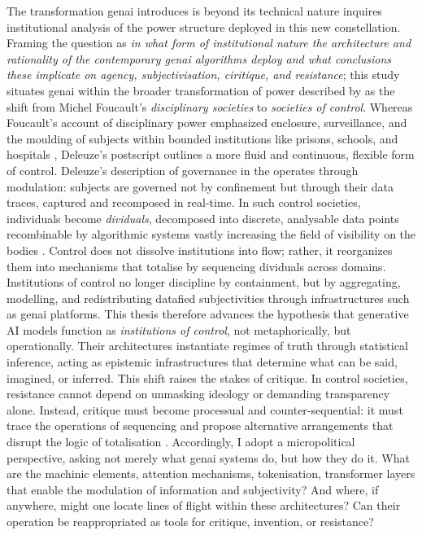 The transformation \gls{genai} introduces is beyond its technical nature inquires institutional analysis \parencite{mackenzie2021} of the power structure deployed in this new constellation. Framing the question as \emph{in what form of institutional nature the architecture and rationality of the contemporary \gls{genai} algorithms deploy and what conclusions these implicate on agency, subjectivisation, ciritique, and resistance}; this study situates \gls{genai} within the broader transformation of power described by \textcite{deleuze1992a} as the shift from Michel Foucault's \emph{disciplinary societies} \cite{Foucault1977} to \emph{societies of control}. Whereas Foucault’s account of disciplinary power emphasized enclosure, surveillance, and the moulding of subjects within bounded institutions like prisons, schools, and hospitals \parencite{foucault2008}, Deleuze's postscript outlines a more fluid and continuous, flexible form of control. Deleuze's description of governance in the  operates through modulation: subjects are governed not by confinement but through their data traces, captured and recomposed in real-time. In such control societies, individuals become \emph{dividuals}, decomposed into discrete, analysable data points recombinable by algorithmic systems \parencite{mackenzie2021} vastly increasing the field of visibility on the bodies \parencite{foucault2008}. Control does not dissolve institutions into flow; rather, it reorganizes them into mechanisms that totalise by sequencing dividuals across domains. Institutions of control no longer discipline by containment, but by aggregating, modelling, and redistributing datafied subjectivities through infrastructures such as \gls{genai} platforms. This thesis therefore advances the hypothesis that generative AI models function as \emph{institutions of control}, not metaphorically, but operationally. Their architectures instantiate regimes of truth through statistical inference, acting as epistemic infrastructures that determine what can be said, imagined, or inferred. This shift raises the stakes of critique. In control societies, resistance cannot depend on unmasking ideology or demanding transparency alone. Instead, critique must become processual and counter-sequential: it must trace the operations of sequencing and propose alternative arrangements that disrupt the logic of totalisation \parencite{mackenzie2021} . Accordingly, I adopt a micropolitical perspective, asking not merely what \gls{genai} systems do, but how they do it. What are the machinic elements, attention mechanisms, tokenisation, transformer layers that enable the modulation of information and subjectivity? And where, if anywhere, might one locate lines of flight within these architectures? Can their operation be reappropriated as tools for critique, invention, or resistance?

